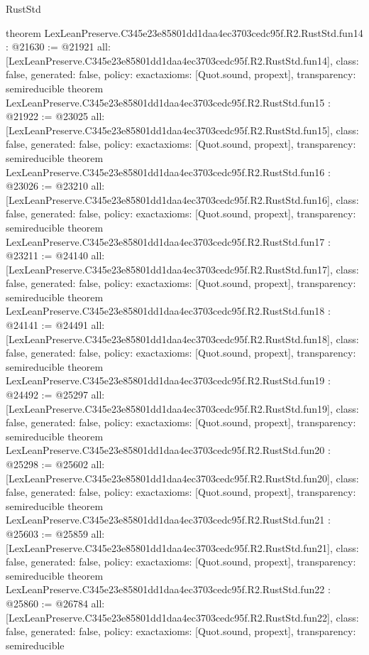 \begin{lexlean}{RustStd}
\begin{coremodule}
{}
theorem LexLeanPreserve.C345e23e85801dd1daa4ec3703cedc95f.R2.RustStd.fun14 : @21630 := @21921 {
  all: [LexLeanPreserve.C345e23e85801dd1daa4ec3703cedc95f.R2.RustStd.fun14],
  class: false,
  generated: false,
  policy: exact{axioms: [Quot.sound, propext]},
  transparency: semireducible
}
theorem LexLeanPreserve.C345e23e85801dd1daa4ec3703cedc95f.R2.RustStd.fun15 : @21922 := @23025 {
  all: [LexLeanPreserve.C345e23e85801dd1daa4ec3703cedc95f.R2.RustStd.fun15],
  class: false,
  generated: false,
  policy: exact{axioms: [Quot.sound, propext]},
  transparency: semireducible
}
theorem LexLeanPreserve.C345e23e85801dd1daa4ec3703cedc95f.R2.RustStd.fun16 : @23026 := @23210 {
  all: [LexLeanPreserve.C345e23e85801dd1daa4ec3703cedc95f.R2.RustStd.fun16],
  class: false,
  generated: false,
  policy: exact{axioms: [Quot.sound, propext]},
  transparency: semireducible
}
theorem LexLeanPreserve.C345e23e85801dd1daa4ec3703cedc95f.R2.RustStd.fun17 : @23211 := @24140 {
  all: [LexLeanPreserve.C345e23e85801dd1daa4ec3703cedc95f.R2.RustStd.fun17],
  class: false,
  generated: false,
  policy: exact{axioms: [Quot.sound, propext]},
  transparency: semireducible
}
theorem LexLeanPreserve.C345e23e85801dd1daa4ec3703cedc95f.R2.RustStd.fun18 : @24141 := @24491 {
  all: [LexLeanPreserve.C345e23e85801dd1daa4ec3703cedc95f.R2.RustStd.fun18],
  class: false,
  generated: false,
  policy: exact{axioms: [Quot.sound, propext]},
  transparency: semireducible
}
theorem LexLeanPreserve.C345e23e85801dd1daa4ec3703cedc95f.R2.RustStd.fun19 : @24492 := @25297 {
  all: [LexLeanPreserve.C345e23e85801dd1daa4ec3703cedc95f.R2.RustStd.fun19],
  class: false,
  generated: false,
  policy: exact{axioms: [Quot.sound, propext]},
  transparency: semireducible
}
theorem LexLeanPreserve.C345e23e85801dd1daa4ec3703cedc95f.R2.RustStd.fun20 : @25298 := @25602 {
  all: [LexLeanPreserve.C345e23e85801dd1daa4ec3703cedc95f.R2.RustStd.fun20],
  class: false,
  generated: false,
  policy: exact{axioms: [Quot.sound, propext]},
  transparency: semireducible
}
theorem LexLeanPreserve.C345e23e85801dd1daa4ec3703cedc95f.R2.RustStd.fun21 : @25603 := @25859 {
  all: [LexLeanPreserve.C345e23e85801dd1daa4ec3703cedc95f.R2.RustStd.fun21],
  class: false,
  generated: false,
  policy: exact{axioms: [Quot.sound, propext]},
  transparency: semireducible
}
theorem LexLeanPreserve.C345e23e85801dd1daa4ec3703cedc95f.R2.RustStd.fun22 : @25860 := @26784 {
  all: [LexLeanPreserve.C345e23e85801dd1daa4ec3703cedc95f.R2.RustStd.fun22],
  class: false,
  generated: false,
  policy: exact{axioms: [Quot.sound, propext]},
  transparency: semireducible
}
\end{coremodule}
\end{lexlean}
